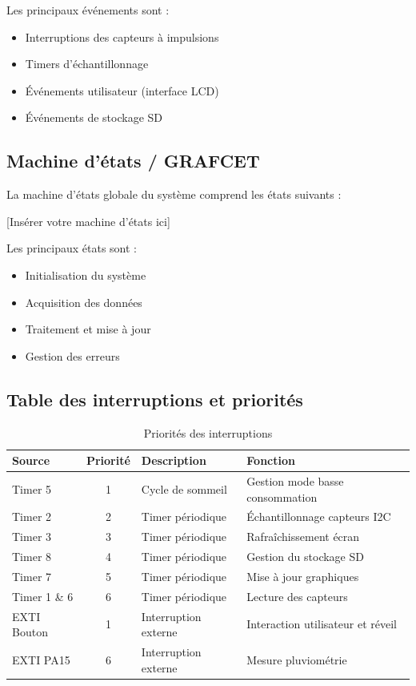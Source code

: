 \documentclass[12pt]{article}
\begin{document}
Les principaux événements sont :
\begin{itemize}
    \item Interruptions des capteurs à impulsions
    \item Timers d'échantillonnage
    \item Événements utilisateur (interface LCD)
    \item Événements de stockage SD
\end{itemize}

\subsection{Machine d'états / GRAFCET}
La machine d'états globale du système comprend les états suivants :

[Insérer votre machine d'états ici]

Les principaux états sont :
\begin{itemize}
    \item Initialisation du système
    \item Acquisition des données
    \item Traitement et mise à jour
    \item Gestion des erreurs
\end{itemize}

\subsection{Table des interruptions et priorités}
\begin{table}[H]
\centering
\caption{Priorités des interruptions}
\begin{tabular}{|l|c|l|l|}
\hline
\textbf{Source} & \textbf{Priorité} & \textbf{Description} & \textbf{Fonction} \\
\hline
Timer 5 & 1 & Cycle de sommeil & Gestion mode basse consommation \\
\hline
Timer 2 & 2 & Timer périodique & Échantillonnage capteurs I2C \\
\hline
Timer 3 & 3 & Timer périodique & Rafraîchissement écran \\
\hline
Timer 8 & 4 & Timer périodique & Gestion du stockage SD \\
\hline
Timer 7 & 5 & Timer périodique & Mise à jour graphiques \\
\hline
Timer 1 \& 6 & 6 & Timer périodique & Lecture des capteurs \\
\hline
EXTI Bouton & 1 & Interruption externe & Interaction utilisateur et réveil \\
\hline
EXTI PA15 & 6 & Interruption externe & Mesure pluviométrie \\
\hline
\end{tabular}
\end{table}
\end{document}
